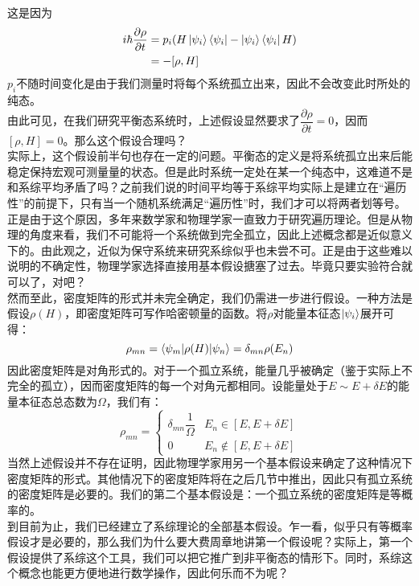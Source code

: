 \documentclass[hyperref,UTF8]{ctexbook}
\begin{document}
这是因为
\begin{align*}
	i\hbar\frac{\partial\rho}{\partial t}&=p_i(H\ket{\psi_i}\bra{\psi_i}-\ket{\psi_i}\bra{\psi_i}H)\\
	&=-[\rho,H]
\end{align*}
$p_i$不随时间变化是由于我们测量时将每个系统孤立出来，因此不会改变此时所处的纯态。\\
\indent 由此可见，在我们研究平衡态系统时，上述假设显然要求了$\dfrac{\partial\rho}{\partial t}=0$，因而$[\rho,H]=0$。那么这个假设合理吗？\\
\indent 实际上，这个假设前半句也存在一定的问题。平衡态的定义是将系统孤立出来后能稳定保持宏观可测量量的状态。但是此时系统一定处在某一个纯态中，这难道不是和系综平均矛盾了吗？之前我们说的时间平均等于系综平均实际上是建立在“遍历性”的前提下，只有当一个随机系统满足“遍历性”时，我们才可以将两者划等号。正是由于这个原因，多年来数学家和物理学家一直致力于研究遍历理论。但是从物理的角度来看，我们不可能将一个系统做到完全孤立，因此上述概念都是近似意义下的。由此观之，近似为保守系统来研究系综似乎也未尝不可。正是由于这些难以说明的不确定性，物理学家选择直接用基本假设搪塞了过去。毕竟只要实验符合就可以了，对吧？\\
\indent 然而至此，密度矩阵的形式并未完全确定，我们仍需进一步进行假设。一种方法是假设$\rho(H)$，即密度矩阵可写作哈密顿量的函数。将$\rho$对能量本征态$\ket{\psi_i}$展开可得：
\[\rho_{mn}=\braket{\psi_m|\rho(H)|\psi_n}=\delta_{mn}\rho(E_n)\]
因此密度矩阵是对角形式的。对于一个孤立系统，能量几乎被确定（鉴于实际上不完全的孤立），因而密度矩阵的每一个对角元都相同。设能量处于$E\sim E+\delta E$的能量本征态总态数为$\Omega$，我们有：
\[\rho_{mn}=\begin{cases}
	\delta_{mn}\dfrac{1}{\Omega}&E_n\in[E,E+\delta E]\\[8pt]
	0&E_n\notin[E,E+\delta E]
\end{cases}\]
当然上述假设并不存在证明，因此物理学家用另一个基本假设来确定了这种情况下密度矩阵的形式。其他情况下的密度矩阵将在之后几节中推出，因此只有孤立系统的密度矩阵是必要的。我们的第二个基本假设是：一个孤立系统的密度矩阵是等概率的。\\
\indent 到目前为止，我们已经建立了系综理论的全部基本假设。乍一看，似乎只有等概率假设才是必要的，那么我们为什么要大费周章地讲第一个假设呢？实际上，第一个假设提供了系综这个工具，我们可以把它推广到非平衡态的情形下。同时，系综这个概念也能更方便地进行数学操作，因此何乐而不为呢？
\end{document}
